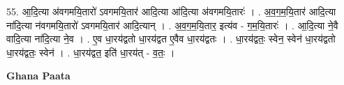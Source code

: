 \documentclass[17pt]{extarticle}
\begin{document}
55. आ॒दि॒त्या अ॑वगमयि॒तारो॑ ऽवगमयि॒तार॑ आदि॒त्या आ॑दि॒त्या अ॑वगमयि॒तारः॑ । . अ॒व॒ग॒म॒यि॒तार॑ आदि॒त्या ना॑दि॒त्या न॑वगमयि॒तारो॑ ऽवगमयि॒तार॑ आदि॒त्यान् । . अ॒व॒ग॒म॒यि॒तार॒ इत्य॑व - ग॒म॒यि॒तारः॑ । . आ॒दि॒त्या ने॒वै वादि॒त्या ना॑दि॒त्या ने॒व । . ए॒व धा॒रय॑द्वतो धा॒रय॑द्वत ए॒वैव धा॒रय॑द्वतः । . धा॒रय॑द्वतः॒ स्वेन॒ स्वेन॑ धा॒रय॑द्वतो धा॒रय॑द्वतः॒ स्वेन॑ । . धा॒रय॑द्वत॒ इति॑ धा॒रय॑त् - व॒तः॒ । \newline

\textbf{Ghana Paata } \newline
\end{document}

